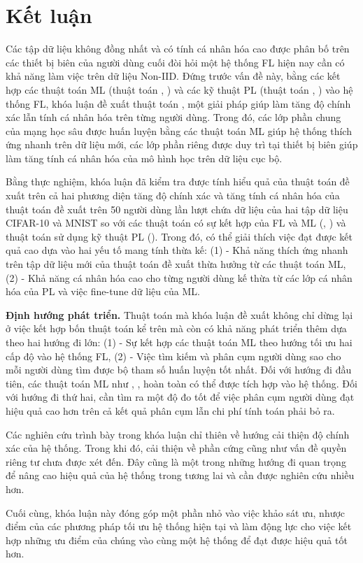 \chapter{Kết luận}
\label{Chapter6}

Các tập dữ liệu không đồng nhất và có tính cá nhân hóa cao được phân bố trên các thiết bị biên của người dùng cuối đòi hỏi một hệ thống FL hiện nay cần có khả năng làm việc trên dữ liệu Non-IID. Đứng trước vấn đề này, bằng các kết hợp các thuật toán ML (thuật toán , ) và các kỹ thuật PL (thuật toán , ) vào hệ thống FL, khóa luận đề xuất thuật toán , một giải pháp giúp làm tăng độ chính xác lẫn tính cá nhân hóa trên từng người dùng. Trong đó, các lớp phần chung của mạng học sâu được huấn luyện bằng các thuật toán ML giúp hệ thống thích ứng nhanh trên dữ liệu mới, các lớp phần riêng được duy trì tại thiết bị biên giúp làm tăng tính cá nhân hóa của mô hình học trên dữ liệu cục bộ.

Bằng thực nghiệm, khóa luận đã kiểm tra được tính hiểu quả của thuật toán đề xuất trên cả hai phương diện tăng độ chính xác và tăng tính cá nhân hóa của thuật toán đề xuất trên 50 người dùng lần lượt chứa dữ liệu của hai tập dữ liệu CIFAR-10 và MNIST so với các thuật toán có sự kết hợp của FL và ML (, ) và thuật toán sử dụng kỹ thuật PL (). Trong đó, có thể giải thích việc đạt được kết quả cao dựa vào hai yếu tố mang tính thừa kế: (1) - Khả năng thích ứng nhanh trên tập dữ liệu mới của thuật toán đề xuất thừa hưởng từ các thuật toán ML, (2) - Khả năng cá nhân hóa cao cho từng người dùng kế thừa từ các lớp cá nhân hóa của PL và việc fine-tune dữ liệu của ML.

\textbf{Định hướng phát triển.} Thuật toán mà khóa luận đề xuất không chỉ dừng lại ở việc kết hợp bốn thuật toán kể trên mà còn có khả năng phát triển thêm dựa theo hai hướng đi lớn: (1) - Sự kết hợp các thuật toán ML theo hướng tối ưu hai cấp độ vào hệ thống FL, (2) - Việc tìm kiếm và phân cụm người dùng sao cho mỗi người dùng tìm được bộ tham số huấn luyện tốt nhất. Đối với hướng đi đầu tiên, các thuật toán ML như  \cite{finn2017model},  \cite{nichol2018first},  \cite{rajeswaran2019meta} hoàn toàn có thể được tích hợp vào hệ thống. Đối với hướng đi thứ hai, cần tìm ra một độ đo tốt để việc phân cụm người dùng đạt hiệu quả cao hơn trên cả kết quả phân cụm lẫn chi phí tính toán phải bỏ ra.

Các nghiên cứu trình bày trong khóa luận chỉ thiên về hướng cải thiện độ chính xác của hệ thống. Trong khi đó, cải thiện về phần cứng cũng như vấn đề quyền riêng tư chưa được xét đến. Đây cũng là một trong những hướng đi quan trọng để nâng cao hiệu quả của hệ thống trong tương lai và cần được nghiên cứu nhiều hơn.

Cuối cùng, khóa luận này đóng góp một phần nhỏ vào việc khảo sát ưu, nhược điểm của các phương pháp tối ưu hệ thống hiện tại và làm động lực cho việc kết hợp những ưu điểm của chúng vào cùng một hệ thống để đạt được hiệu quả tốt hơn.
